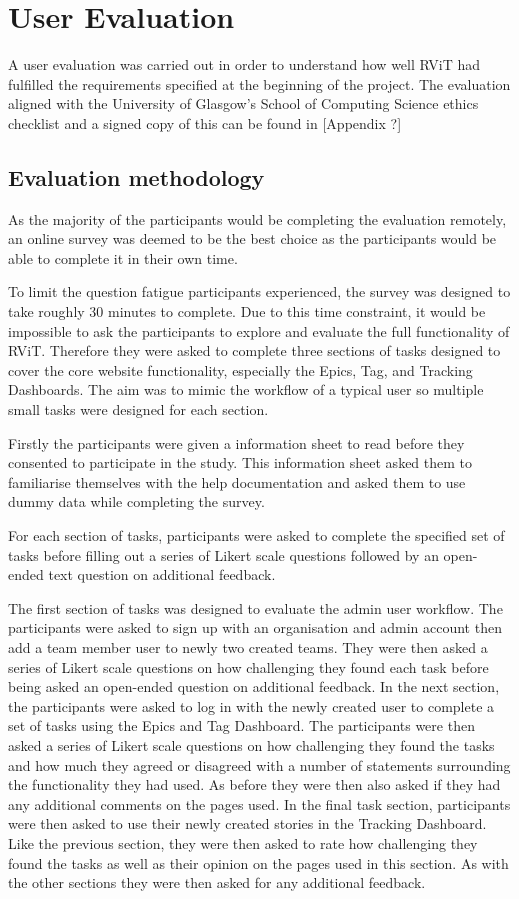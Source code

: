 \documentclass[l4proj.tex]{subfiles}
\begin{document}
\section{User Evaluation}
A user evaluation was carried out in order to understand how well RViT had fulfilled the requirements specified at the beginning of the project. The evaluation aligned with the University of Glasgow's School of Computing Science ethics checklist and a signed copy of this can be found in [Appendix ?]


\subsection{Evaluation methodology}
As the majority of the participants would be completing the evaluation remotely, an online survey was deemed to be the best choice as the participants would be able to complete it in their own time.

To limit the question fatigue participants experienced, the survey was designed to take roughly 30 minutes to complete. Due to this time constraint, it would be impossible to ask the participants to explore and evaluate the full functionality of RViT. Therefore they were asked to complete three sections of tasks designed to cover the core website functionality, especially the Epics, Tag, and Tracking Dashboards. The aim was to mimic the workflow of a typical user so multiple small tasks were designed for each section.

Firstly the participants were given a information sheet to read before they consented to participate in the study. This information sheet asked them to familiarise themselves with the help documentation and asked them to use dummy data while completing the survey.

For each section of tasks, participants were asked to complete the specified set of tasks before filling out a series of Likert scale questions followed by an open-ended text question on additional feedback.

The first section of tasks was designed to evaluate the admin user workflow. The participants were asked to sign up with an organisation and admin account then add a team member user to newly two created teams. They were then asked a series of Likert scale questions on how challenging they found each task before being asked an open-ended question on additional feedback. In the next section, the participants were asked to log in with the newly created user to complete a set of tasks using the Epics and Tag Dashboard. The participants were then asked a series of Likert scale questions on how challenging they found the tasks and how much they agreed or disagreed with a number of statements surrounding the functionality they had used. As before they were then also asked if they had any additional comments on the pages used. In the final task section, participants were then asked to use their newly created stories in the Tracking Dashboard. Like the previous section, they were then asked to rate how challenging they found the tasks as well as their opinion on the pages used in this section. As with the other sections they were then asked for any additional feedback.
\end{document}
